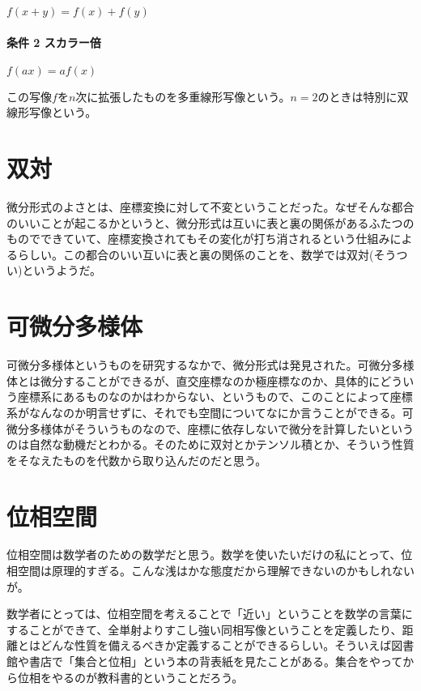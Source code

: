 $ f(x + y) = f(x) + f(y) $

\paragraph{条件 2 スカラー倍}

$ f(ax) = a f(x) $

この写像$f$を$n$次に拡張したものを多重線形写像という。$n=2$のときは特別に双線形写像という。

\newpage


\section{双対}

微分形式のよさとは、座標変換に対して不変ということだった。なぜそんな都合のいいことが起こるかというと、微分形式は互いに表と裏の関係があるふたつのものでできていて、座標変換されてもその変化が打ち消されるという仕組みによるらしい。この都合のいい互いに表と裏の関係のことを、数学では双対(そうつい)というようだ。

\newpage


\section{可微分多様体}

可微分多様体というものを研究するなかで、微分形式は発見された。可微分多様体とは微分することができるが、直交座標なのか極座標なのか、具体的にどういう座標系にあるものなのかはわからない、というもので、このことによって座標系がなんなのか明言せずに、それでも空間についてなにか言うことができる。可微分多様体がそういうものなので、座標に依存しないで微分を計算したいというのは自然な動機だとわかる。そのために双対とかテンソル積とか、そういう性質をそなえたものを代数から取り込んだのだと思う。

\newpage


\section{位相空間}

位相空間は数学者のための数学だと思う。数学を使いたいだけの私にとって、位相空間は原理的すぎる。こんな浅はかな態度だから理解できないのかもしれないが。

数学者にとっては、位相空間を考えることで「近い」ということを数学の言葉にすることができて、全単射よりすこし強い同相写像ということを定義したり、距離とはどんな性質を備えるべきか定義することができるらしい。そういえば図書館や書店で「集合と位相」という本の背表紙を見たことがある。集合をやってから位相をやるのが教科書的ということだろう。

\newpage

\newpage


